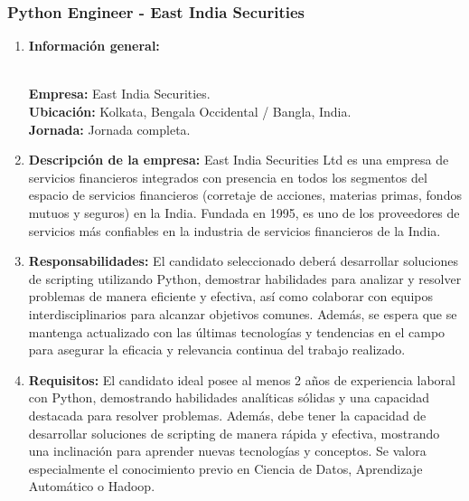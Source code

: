 \documentclass[12pt]{article}
\begin{document}
            \subsubsection{Python Engineer - East India Securities}
                \begin{enumerate}
                    \item \textbf{Información general:}
                    
                        \textbf{\\Empresa:} East India Securities.
                        \textbf{\\Ubicación:} Kolkata, Bengala Occidental / Bangla, India.
                        \textbf{\\Jornada:} Jornada completa.

                    \item \textbf{Descripción de la empresa:}
                        East India Securities Ltd es una empresa de servicios financieros integrados con presencia en todos los segmentos del espacio de servicios financieros (corretaje de acciones, materias primas, fondos mutuos y seguros) en la India. Fundada en 1995, es uno de los proveedores de servicios más confiables en la industria de servicios financieros de la India.

                    \item \textbf{Responsabilidades:}
                        El candidato seleccionado deberá desarrollar soluciones de scripting utilizando Python, demostrar habilidades para analizar y resolver problemas de manera eficiente y efectiva, así como colaborar con equipos interdisciplinarios para alcanzar objetivos comunes. Además, se espera que se mantenga actualizado con las últimas tecnologías y tendencias en el campo para asegurar la eficacia y relevancia continua del trabajo realizado.

                    \item \textbf{Requisitos:}
                        El candidato ideal posee al menos 2 años de experiencia laboral con Python, demostrando habilidades analíticas sólidas y una capacidad destacada para resolver problemas. Además, debe tener la capacidad de desarrollar soluciones de scripting de manera rápida y efectiva, mostrando una inclinación para aprender nuevas tecnologías y conceptos. Se valora especialmente el conocimiento previo en Ciencia de Datos, Aprendizaje Automático o Hadoop.

                \end{enumerate}
\end{document}
